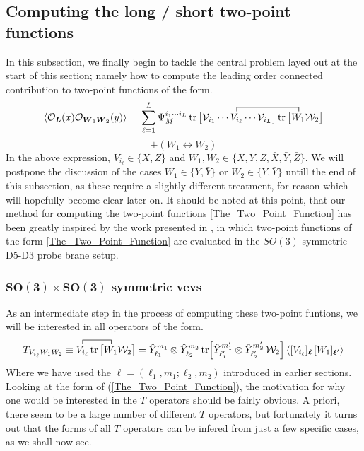 \newpage
\subsection{Computing the long / short two-point functions}
In this subsection, we finally begin to tackle the central problem layed out at the start of this section; namely how to compute the leading order connected contribution to two-point functions of the form.
%
%
\begin{equation*}
\expval{\mathcal{O}_{\boldsymbol{L}}(x) \mathcal{O}_{\boldsymbol{W}_1 \boldsymbol{W}_2}(y)}
=
\contraction{\sum_{\ell=1}^L \Psi_M^{i_1 \cdots i_L} 
\tr \big[ \mathcal{V}_{i_1} \cdots }
{V_{i_\ell}}
{ \cdots \mathcal{V}_{i_L} \big] \tr \big[ }
{W_1}
\sum_{\ell=1}^L \Psi_M^{i_1 \cdots i_L} 
\tr \big[ \mathcal{V}_{i_1} \cdots V_{i_\ell} \cdots \mathcal{V}_{i_L} \big] 
\tr \big[ W_1 \mathcal{W}_2 \big]
\end{equation*}
%
%
\begin{equation}\label{The_Two_Point_Function}
+
(W_1 \leftrightarrow W_2)
\end{equation}
%
%
In the above expression, $V_{i_\ell} \in \{ X, Z \}$ and $W_1, W_2 \in \{ X,Y,Z,\bar{X},\bar{Y},\bar{Z} \}$. We will postpone the discussion of the cases $W_1 \in \{ Y,\bar{Y} \}$ or $W_2 \in \{ Y,\bar{Y} \}$ untill the end of this subsection, as these require a slightly different treatment, for reason which will hopefully become clear later on. It should be noted at this point, that our method for computing the two-point functions \ref{The_Two_Point_Function} has been greatly inspired by the work presented in \cite{Length L length 2 two-point functions D5-D3}, in which two-point functions of the form \ref{The_Two_Point_Function} are evaluated in the $SO(3)$ symmetric D5-D3 probe brane setup.

\subsubsection[$SO(3) \times SO(3)$ symmetric vevs]{$\mathbf{SO(3) \times SO(3)}$ symmetric vevs}
As an intermediate step in the process of computing these two-point funtions, we will be interested in all operators of the form.
%
%
\begin{equation}\label{The T operators}
T_{V_{i_\ell} W_1 W_2}
\equiv
\contraction{}
{V_{i_\ell}}
{ \tr \big[ }
{W_1}
V_{i_\ell} \tr \big[ W_1 \mathcal{W}_2 \big]
=
\hat{Y}_{\ell_1}^{m_1} \otimes \hat{Y}_{\ell_2}^{m_2}
\tr[\hat{Y}_{\ell_1'}^{m_1'} \otimes \hat{Y}_{\ell_2'}^{m_2'} \, \mathcal{W}_2]
\expval{[V_{i_{\ell}}]_{\boldsymbol{\ell}} \, [W_1]_{\boldsymbol{\ell}'}}
\end{equation}
%
%
Where we have used the $\boldsymbol{\ell} = (\ell_1, m_1; \ell_2, m_2)$ introduced in earlier sections. Looking at the form of (\ref{The_Two_Point_Function}), the motivation for why one would be interested in the $T$ operators should be fairly obvious. A priori, there seem to be a large number of different $T$ operators, but fortunately it turns out that the forms of all $T$ operators can be infered from just a few specific cases, as we shall now see.

